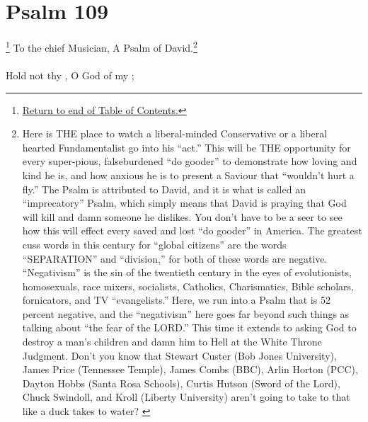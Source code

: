 \chapter{Psalm 109}
\footnote{\textcolor[rgb]{0.00,0.25,0.00}{\hyperlink{TOC}{Return to end of Table of Contents.}}}
\textcolor[rgb]{0.00,0.00,1.00}{To the chief Musician, A Psalm of David.}\footnote{Here is THE place to watch a liberal-minded
Conservative or a liberal hearted
Fundamentalist go into his “act.” This will be
THE opportunity for every super-pious, falseburdened
“do gooder” to demonstrate how
loving and kind he is, and how anxious he is
to present a Saviour that “wouldn’t hurt a
fly.”
The Psalm is attributed to David, and it is
what is called an “imprecatory” Psalm, which
simply means that David is praying that God
will kill and damn someone he dislikes. You
don’t have to be a seer to see how this will
effect every saved and lost “do gooder” in
America. The greatest cuss words in this
century for “global citizens” are the words
“SEPARATION” and “division,” for both of
these words are negative. “Negativism” is the
sin of the twentieth century in the eyes of
evolutionists, homosexuals, race mixers,
socialists, Catholics, Charismatics, Bible
scholars, fornicators, and TV “evangelists.”
Here, we run into a Psalm that is 52 percent
negative, and the “negativism” here goes far
beyond such things as talking about “the fear
of the LORD.” This time it extends to asking
God to destroy a man’s children and damn
him to Hell at the White Throne Judgment.
Don’t you know that Stewart Custer (Bob
Jones University), James Price (Tennessee
Temple), James Combs (BBC), Arlin Horton
(PCC), Dayton Hobbs (Santa Rosa Schools),
Curtis Hutson (Sword of the Lord), Chuck
Swindoll, and Kroll (Liberty University)
aren’t going to take to that like a duck takes
to water? \cite{Ruckman1992Psalms}}\\
\\
\textcolor[rgb]{0.00,0.00,1.00}{Hold not thy , O God of my ;}
